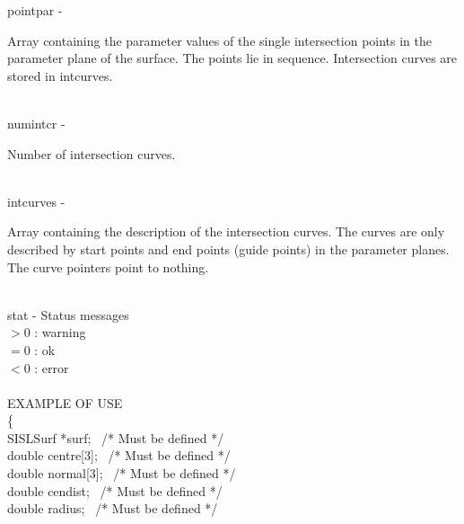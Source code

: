         \>\>    {\fov pointpar}\> - \>  \begin{minipg2}
                                Array containing the parameter values of the single
                                intersection points in the parameter plane of the
                                surface. The points lie in sequence. Intersection curves
                                are stored in intcurves.
                                \end{minipg2}\\[0.8ex]
        \>\>    {\fov numintcr}\> - \>  \begin{minipg2}
                                Number of intersection curves.
                                \end{minipg2}\\
        \>\>    {\fov intcurves}\> - \>\begin{minipg2}
                                Array containing the description of the intersection
                                curves. The curves are only described by
                                start points and end points (guide points) in
                                the parameter planes.
                                The curve pointers point
                                to nothing.
                                \end{minipg2}\\[0.3ex]
        \>\>    {\fov stat}     \> - \> Status messages\\
                \>\>\>\>\>              $> 0$   : warning\\
                \>\>\>\>\>              $= 0$   : ok\\
                \>\>\>\>\>              $< 0$   : error\\
\\
EXAMPLE OF USE\\
                \>      \{ \\
                \>\>    SISLSurf        \>      *{\fov surf}; \, /* Must be defined */\\
                \>\>    double  \>      {\fov centre}[3]; \, /* Must be defined */\\
                \>\>    double  \>      {\fov normal}[3]; \, /* Must be defined */\\
                \>\>    double  \>      {\fov cendist}; \, /* Must be defined */\\
                \>\>    double  \>      {\fov radius}; \, /* Must be defined */\\
